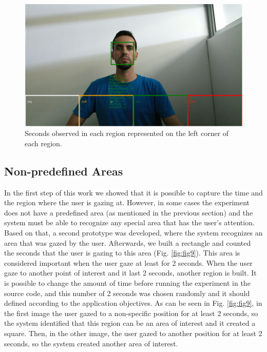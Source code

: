 \documentclass[10pt, conference]{IEEEtran}
\begin{document}
    \begin{figure}[t]
        \centering
        \includegraphics{figures/pic8.png}
        \caption{Seconds observed in each region represented on the left corner of each region.}
        \label{fig:fig8}
    \end{figure}


\subsection{Non-predefined Areas}

	In the first step of this work we showed that it is possible to capture the time and the region where the user is gazing at. 
	However, in some cases the experiment does not have a predefined area (as mentioned in the previous section) and the system must be able to recognize any special area that has the user's attention. 
	Based on that, a second prototype was developed, where the system recognizes an area that was gazed by the user. 
	Afterwards, we built a rectangle and counted the seconds that the user is gazing to this area (Fig. \ref{fig:fig9}). 
	This area is considered important when the user gaze at least for 2 seconds. 
	When the user gaze to another point of interest and it last 2 seconds, another region is built. It is possible to change the amount of time before running the experiment in the source code, and this number of 2 seconds was chosen randomly and it should defined according to the application objectives.
	As can be seen in Fig. \ref{fig:fig9}, in the first image the user gazed to a non-specific position for at least 2 seconds, so the system identified that this region can be an area of interest and it created a square. 
	Then, in the other image, the user gazed to another position for at least 2 seconds, so the system created another area of interest. 
\end{document}
